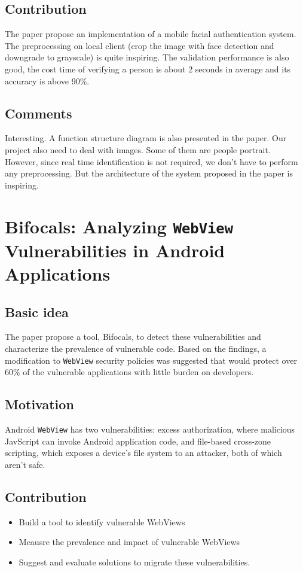 \documentclass[a4paper]{article}
\begin{document}
    \subsection{Contribution}
      The paper propose an implementation of a mobile facial authentication system. The preprocessing on local client (crop the image with face detection and downgrade to grayscale) is quite inspiring. The validation performance is also good, the cost time of verifying a person is about 2  seconds in average and its accuracy is above 90\%.
    \subsection{Comments}
      Interesting. A function structure diagram is also presented in the paper. Our project also need to deal with images. Some of them are people portrait. However, since real time identification is not required, we don’t have to perform any preprocessing. But the architecture of the system proposed in the paper is inspiring.

  \section{Bifocals: Analyzing \texttt{WebView} Vulnerabilities in Android Applications}
    \subsection{Basic idea}
      The paper propose a tool, Bifocals, to detect these vulnerabilities and characterize the prevalence of vulnerable code. Based on the findings, a modification to \texttt{WebView} security policies was suggested that would protect over 60\% of the vulnerable applications with little burden on developers.
    \subsection{Motivation}
      Android \texttt{WebView} has two vulnerabilities: excess authorization, where malicious JavScript can invoke Android application code,  and file-based cross-zone scripting, which exposes a device's file system to an attacker, both of which aren't safe. 
    \subsection{Contribution}
      \begin{itemize}
        \item Build a tool to identify vulnerable WebViews
        \item Meausre the prevalence and impact of vulnerable WebViews
        \item Suggest and evaluate solutions to migrate these vulnerabilities.
      \end{itemize}
\end{document}
